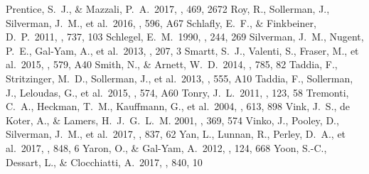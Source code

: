 \documentclass[twocolumn]{aastex61}
\begin{document}
\begin{thebibliography}{}
 Prentice, S.~J., \& Mazzali, P.~A.\ 2017, \mnras, 469, 2672 
 Roy, R., Sollerman, J., Silverman, J.~M., et al.\ 2016, \aap, 596, A67 
 Schlafly, E.~F., \& Finkbeiner, D.~P.\ 2011, \apj, 737, 103 
 Schlegel, E.~M.\ 1990, \mnras, 244, 269 
 Silverman, J.~M., Nugent, P.~E., Gal-Yam, A., et al.\ 2013, \apjs, 207, 3 
 Smartt, S.~J., Valenti, S., Fraser, M., et al.\ 2015, \aap, 579, A40 
 Smith, N., \& Arnett, W.~D.\ 2014, \apj, 785, 82 
 Taddia, F., Stritzinger, M.~D., Sollerman, J., et al.\ 2013, \aap, 555, A10 
 Taddia, F., Sollerman, J., Leloudas, G., et al.\ 2015, \aap, 574, A60 
 Tonry, J.~L.\ 2011, \pasp, 123, 58 
 Tremonti, C.~A., Heckman, T.~M., Kauffmann, G., et al.\ 2004, \apj, 613, 898 
 Vink, J.~S., de Koter, A., \& Lamers, H.~J.~G.~L.~M. 2001, \aap, 369, 574  
 Vinko, J., Pooley, D., Silverman, J.~M., et al.\ 2017, \apj, 837, 62 
 Yan, L., Lunnan, R., Perley, D.~A., et al.\ 2017, \apj, 848, 6 
 Yaron, O., \& Gal-Yam, A.\ 2012, \pasp, 124, 668 
 Yoon, S.-C., Dessart, L., \& Clocchiatti, A.\ 2017, \apj, 840, 10 


\end{thebibliography}


\end{document}
